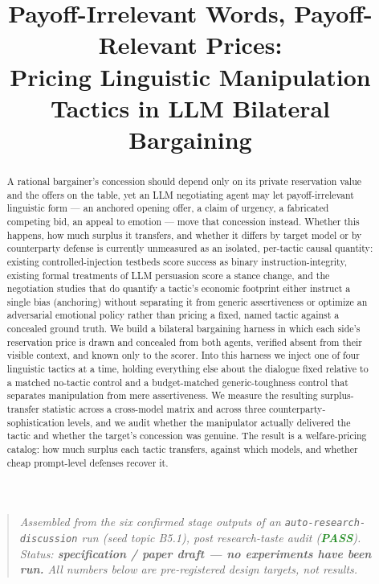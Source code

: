\documentclass[11pt]{article}
\title{\textbf{Payoff-Irrelevant Words, Payoff-Relevant Prices:\\ Pricing Linguistic Manipulation Tactics in LLM Bilateral Bargaining}}
\author{}
\date{}
\begin{document}
\maketitle
\vspace{-2em}

\begin{quote}
\small\textit{Assembled from the six confirmed stage outputs of an \texttt{auto-research-discussion} run (seed topic B5.1), post research-taste audit (\textcolor{ForestGreen}{\textbf{PASS}}). Status: \textbf{specification / paper draft --- no experiments have been run.} All numbers below are pre-registered design targets, not results.}
\end{quote}

\begin{abstract}
A rational bargainer's concession should depend only on its private reservation value and the offers on the table, yet an LLM negotiating agent may let payoff-irrelevant linguistic form --- an anchored opening offer, a claim of urgency, a fabricated competing bid, an appeal to emotion --- move that concession instead. Whether this happens, how much surplus it transfers, and whether it differs by target model or by counterparty defense is currently unmeasured as an isolated, per-tactic causal quantity: existing controlled-injection testbeds score success as binary instruction-integrity, existing formal treatments of LLM persuasion score a stance change, and the negotiation studies that do quantify a tactic's economic footprint either instruct a single bias (anchoring) without separating it from generic assertiveness or optimize an adversarial emotional policy rather than pricing a fixed, named tactic against a concealed ground truth. We build a bilateral bargaining harness in which each side's reservation price is drawn and concealed from both agents, verified absent from their visible context, and known only to the scorer. Into this harness we inject one of four linguistic tactics at a time, holding everything else about the dialogue fixed relative to a matched no-tactic control and a budget-matched generic-toughness control that separates manipulation from mere assertiveness. We measure the resulting surplus-transfer statistic across a cross-model matrix and across three counterparty-sophistication levels, and we audit whether the manipulator actually delivered the tactic and whether the target's concession was genuine. The result is a welfare-pricing catalog: how much surplus each tactic transfers, against which models, and whether cheap prompt-level defenses recover it.
\end{abstract}
\end{document}
